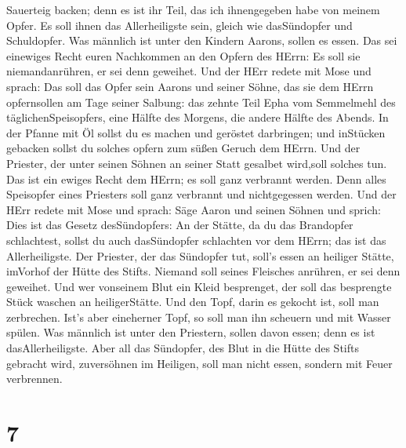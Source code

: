 Sauerteig backen; denn es ist ihr Teil, das ich ihnengegeben habe von
meinem Opfer. Es soll ihnen das Allerheiligste sein, gleich wie
dasSündopfer und Schuldopfer.  Was männlich ist unter den
Kindern Aarons, sollen es essen. Das sei einewiges Recht euren
Nachkommen an den Opfern des HErrn: Es soll sie niemandanrühren, er sei
denn geweihet.  Und der HErr redete mit Mose und sprach:
 Das soll das Opfer sein Aarons und seiner Söhne, das sie
dem HErrn opfernsollen am Tage seiner Salbung: das zehnte Teil Epha vom
Semmelmehl des täglichenSpeisopfers, eine Hälfte des Morgens, die andere
Hälfte des Abends.  In der Pfanne mit Öl sollst du es
machen und geröstet darbringen; und inStücken gebacken sollst du solches
opfern zum süßen Geruch dem HErrn.  Und der Priester, der
unter seinen Söhnen an seiner Statt gesalbet wird,soll solches tun. Das
ist ein ewiges Recht dem HErrn; es soll ganz verbrannt werden.
 Denn alles Speisopfer eines Priesters soll ganz verbrannt
und nichtgegessen werden.  Und der HErr redete mit Mose und
sprach:  Säge Aaron und seinen Söhnen und sprich: Dies ist
das Gesetz desSündopfers: An der Stätte, da du das Brandopfer
schlachtest, sollst du auch dasSündopfer schlachten vor dem HErrn; das
ist das Allerheiligste.  Der Priester, der das Sündopfer
tut, soll's essen an heiliger Stätte, imVorhof der Hütte des Stifts.
 Niemand soll seines Fleisches anrühren, er sei denn
geweihet. Und wer vonseinem Blut ein Kleid besprenget, der soll das
besprengte Stück waschen an heiligerStätte.  Und den Topf,
darin es gekocht ist, soll man zerbrechen. Ist's aber eineherner Topf,
so soll man ihn scheuern und mit Wasser spülen.  Was
männlich ist unter den Priestern, sollen davon essen; denn es ist
dasAllerheiligste.  Aber all das Sündopfer, des Blut in die
Hütte des Stifts gebracht wird, zuversöhnen im Heiligen, soll man nicht
essen, sondern mit Feuer verbrennen.

\hypertarget{section-6}{%
\section{7}\label{section-6}}

